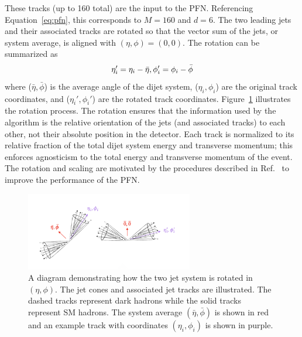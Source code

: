 These tracks (up to 160 total) are the input to the PFN. Referencing Equation~\ref{eq:pfn}, this corresponds to $M = 160$ and $d = 6$. The two leading jets and their associated tracks are rotated so that the vector sum of the jets, or system average, is aligned with $(\eta,\phi) = (0,0)$. The rotation can be summarized as 
\begin{equation}
 \eta_{i}' = \eta_i - \bar{\eta},  \\
 \phi_{i}' = \phi_i - \bar{\phi}
\end{equation}
where ($\bar{\eta}, \bar{\phi}$) is the average angle of the dijet system,  ($\eta_{i}, \phi_{i}$) are the original track coordinates, and ($\eta_{i}', \phi_{i}'$) are the rotated track coordinates. Figure~\ref{fig:jet_rotate} illustrates the rotation process. The rotation ensures that the information used by the algorithm is the relative orientation of the jets (and associated tracks) to each other, not their absolute position in the detector. Each track is normalized to its relative fraction of the total dijet system energy and transverse momentum; this enforces agnosticism to the total energy and transverse momentum of the event. The rotation and scaling are motivated by the procedures described in Ref.~\cite{pfn} to improve the performance of the PFN. 

\begin{figure}[!htbp]
\centering
   \includegraphics[width=0.65\textwidth]{figures/ml/jet_rotate}
    \caption{A diagram demonstrating how the two jet system is rotated in $(\eta,\phi)$. The jet cones and associated jet tracks are illustrated. The dashed tracks represent dark hadrons while the solid tracks represent SM hadrons. The system average $(\bar{\eta},\bar{\phi})$ is shown in red and an example track with coordinates $(\eta_i,\phi_i)$ is shown in purple.
    \label{fig:jet_rotate}}
\end{figure}

